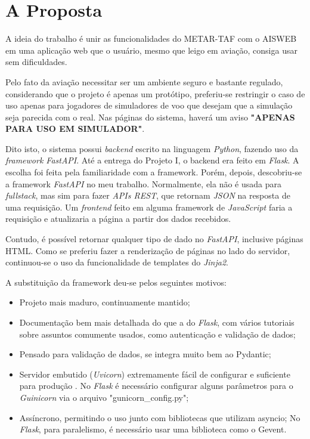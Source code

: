 \chapter{A Proposta}
A ideia do trabalho é unir as funcionalidades do METAR-TAF com o AISWEB em uma 
aplicação web que o usuário, mesmo que leigo em aviação, consiga usar sem 
dificuldades.

Pelo fato da aviação necessitar ser um ambiente seguro e bastante regulado, considerando
que o projeto é apenas um protótipo, preferiu-se restringir o caso de uso apenas
para jogadores de simuladores de voo que desejam que a simulação seja parecida
com o real. Nas páginas do sistema, haverá um aviso \textbf{"APENAS PARA USO EM SIMULADOR"}.

Dito isto, o sistema possui \textit{backend} escrito na linguagem \textit{Python}, 
fazendo uso da 
\textit{framework \textit{FastAPI}}. Até a entrega do Projeto I, o backend era feito em \textit{Flask}. 
A escolha foi feita pela familiaridade com a framework. Porém, depois, 
descobriu-se a framework \textit{FastAPI} no meu trabalho. Normalmente, ela não é usada para 
\textit{fullstack}, mas sim para fazer \textit{APIs REST}, que retornam \textit{JSON} na resposta de uma 
requisição. Um \textit{frontend} feito em alguma framework de \textit{JavaScript} faria a requisição
 e atualizaria a página a partir dos dados recebidos.

Contudo, é possível retornar qualquer tipo de dado no \textit{\textit{FastAPI}}, inclusive páginas 
HTML. Como se preferiu fazer a renderização de páginas no lado do servidor, continuou-se
o uso da funcionalidade de templates do \textit{\textit{Jinja2}}.

A substituição da framework deu-se pelos seguintes motivos:

\begin{itemize}
\item Projeto mais maduro, continuamente mantido;
\item Documentação bem mais detalhada do que a do \textit{Flask}, com vários tutoriais sobre assuntos comumente usados, como autenticação e validação de dados;
\item Pensado para validação de dados, se integra muito bem ao Pydantic;
\item Servidor embutido (\textit{\textit{Uvicorn}}) extremamente fácil de configurar e suficiente para produção \cite{fast-api-prod}.
No \textit{Flask} é necessário configurar alguns parâmetros para o \textit{Guinicorn} via o arquivo "gunicorn\_config.py";
\item Assíncrono, permitindo o uso junto com bibliotecas que utilizam asyncio;
No \textit{Flask}, para paralelismo, é necessário usar uma biblioteca como o Gevent.
\end{itemize}

